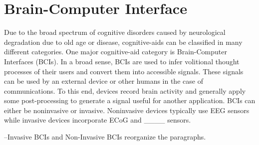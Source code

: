 \section{Brain-Computer Interface}
Due to the broad spectrum of cognitive disorders caused by neurological degradation due to old age or disease, cognitive-aids can be classified in many different categories. One major cognitive-aid category is Brain-Computer Interfaces (BCIs). In a broad sense, BCIs are used to infer volitional thought processes of their users and convert them into accessible signals. These signals can be used by an external device or other humans in the case of communications. To this end, devices record brain activity and generally apply some post-processing to generate a signal useful for another application. BCIs can either be noninvasive or invasive. Noninvasive devices typically use EEG sensors while invasive devices incorporate ECoG and ____ sensors. 

--Invasive BCIs and Non-Invasive BCIs reorganize the paragraphs.

